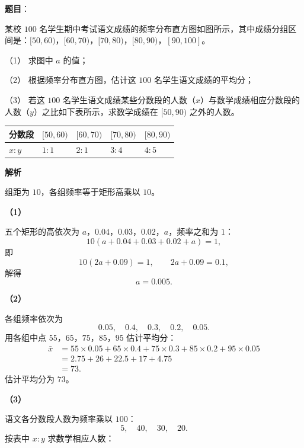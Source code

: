 \begin{answer}

\textbf{题目}：

某校 $100$ 名学生期中考试语文成绩的频率分布直方图如图所示，其中成绩分组区间是：$[50,60)$，$[60,70)$，$[70,80)$，$[80,90)$，$[90,100]$。
\nopagebreak[4]
\begin{center}\end{center}
\nopagebreak[4]
（1） 求图中 $a$ 的值；

（2） 根据频率分布直方图，估计这 $100$ 名学生语文成绩的平均分；

（3） 若这 $100$ 名学生语文成绩某些分数段的人数（$x$）与数学成绩相应分数段的人数（$y$）之比如下表所示，求数学成绩在 $[50,90)$ 之外的人数。

\begin{center}
\begin{tabular}{lllll}
\toprule
分数段 & $[50,60)$ & $[60,70)$ & $[70,80)$ & $[80,90)$ \\
\midrule
$x:y$ & $1:1$ & $2:1$ & $3:4$ & $4:5$ \\
\bottomrule
\end{tabular}
\end{center}

\textbf{解析}

组距为 $10$，各组频率等于矩形高乘以 $10$。

\textbf{（1）}

五个矩形的高依次为 $a$，$0.04$，$0.03$，$0.02$，$a$，频率之和为 $1$：
\nopagebreak[4]
\[10(a+0.04+0.03+0.02+a)=1,\]
即
\nopagebreak[4]
\[10(2a+0.09)=1,\qquad 2a+0.09=0.1,\]
解得
\nopagebreak[4]
\[a=0.005.\]

\textbf{（2）}

各组频率依次为
\nopagebreak[4]
\[0.05,\quad 0.4,\quad 0.3,\quad 0.2,\quad 0.05.\]
用各组中点 $55$，$65$，$75$，$85$，$95$ 估计平均分：
\nopagebreak[4]
\[\begin{aligned}
\bar x&=55\times0.05+65\times0.4+75\times0.3+85\times0.2+95\times0.05\\
&=2.75+26+22.5+17+4.75\\
&=73.
\end{aligned}\]
估计平均分为 $73$。

\textbf{（3）}

语文各分数段人数为频率乘以 $100$：
\nopagebreak[4]
\[5,\quad 40,\quad 30,\quad 20.\]
按表中 $x:y$ 求数学相应人数：


\end{answer}
